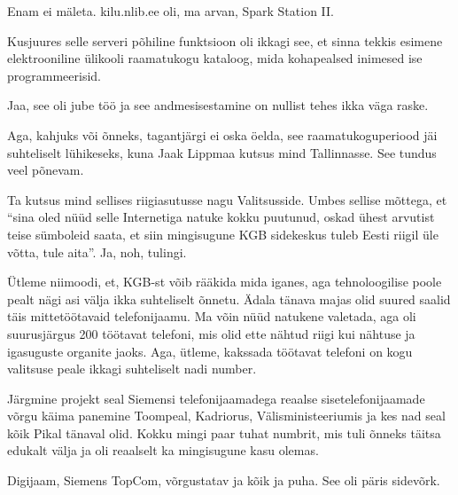 
Enam ei mäleta. kilu.nlib.ee oli, ma arvan, Spark Station II.

Kusjuures selle serveri põhiline funktsioon oli ikkagi see, et sinna tekkis esimene elektrooniline ülikooli raamatukogu kataloog, mida kohapealsed inimesed ise programmeerisid.


Jaa, see oli jube töö ja see andmesisestamine on  nullist tehes ikka väga raske.

Aga, kahjuks või õnneks, tagantjärgi ei oska öelda, see raamatukoguperiood jäi suhteliselt lühikeseks, kuna Jaak Lippmaa kutsus mind Tallinnasse. See tundus veel põnevam. 

Ta kutsus mind sellises riigiasutusse nagu Valitsusside. Umbes sellise mõttega, et \enquote{sina oled nüüd selle Internetiga natuke kokku puutunud, oskad ühest arvutist teise sümboleid saata, et siin mingisugune KGB sidekeskus tuleb Eesti riigil üle võtta, tule aita}. Ja, noh, tulingi.

Ütleme niimoodi, et, KGB-st võib rääkida mida iganes, aga tehnoloogilise poole pealt nägi asi välja ikka suhteliselt õnnetu. Ädala tänava majas olid suured saalid täis mittetöötavaid telefonijaamu. Ma võin nüüd natukene valetada, aga oli suurusjärgus 200 töötavat telefoni, mis olid  ette nähtud riigi kui nähtuse ja igasuguste organite jaoks. Aga, ütleme, kakssada töötavat telefoni on kogu valitsuse peale ikkagi suhteliselt nadi number.

Järgmine projekt seal Siemensi telefonijaamadega reaalse sisetelefonijaamade võrgu käima panemine Toompeal, Kadriorus, Välisministeeriumis ja kes nad seal kõik Pikal tänaval olid. Kokku mingi paar tuhat numbrit, mis tuli õnneks täitsa edukalt välja ja oli reaalselt ka mingisugune kasu olemas.


Digijaam, Siemens TopCom,  võrgustatav ja kõik ja puha. See  oli päris sidevõrk.

